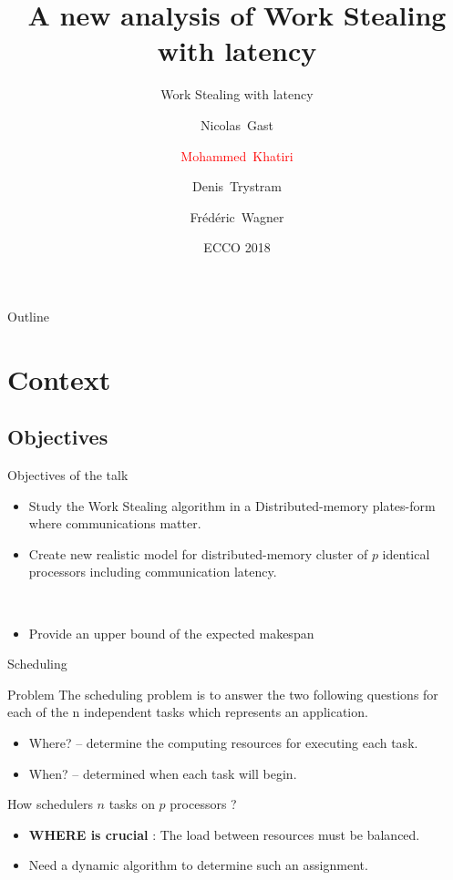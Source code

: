 \documentclass{beamer}
\title{A new analysis of Work Stealing with latency}
\subtitle{Work Stealing with latency}
\author{Nicolas~Gast\inst{1} \and \textcolor{red}{Mohammed~Khatiri}\inst{1}\inst{2} \and Denis~Trystram\inst{1} \and Frédéric~Wagner\inst{1}}
\institute[Univ. Grenoble Alpes, CNRS, Inria, LIG] %
{
    \inst{1}%
  Univ. Grenoble Alpes\\
  CNRS, Inria, LIG, France
  \and
  \inst{2}%
  University Mohammed First\\
  Faculty of Sciences, LaRI, Morocco}
\date{ECCO 2018}
\begin{document}
\begin{frame}
    \titlepage
\end{frame}

\begin{frame}{Outline}
    \tableofcontents
\end{frame}

\section{Context}

\subsection{Objectives}

\begin{frame}{Objectives of the talk}
    \begin{itemize}[<+->]
        \item {
               Study the Work Stealing algorithm in a Distributed-memory plates-form where communications matter. 
            }\\ 
        \item {

               Create new realistic model for distributed-memory cluster of $p$ identical processors including communication latency. 
            }\\          

        \item {
                Provide an upper bound of the expected makespan
            }
    \end{itemize}
\end{frame}


\begin{frame}{Scheduling}
    \begin{block}{Problem}
        The scheduling problem is to answer the two following questions
        for each of the n independent tasks which represents an application.
        \begin{itemize}
            \item \alert{Where?} – determine the computing resources for executing each task.
            \item \alert{When?} – determined when each task will begin. 

        \end{itemize}
    \end{block}
    How schedulers $n$ tasks on $p$ processors ?
    \begin{itemize}
        \item \textbf{WHERE is crucial} : The load between resources must be balanced. 
        \item Need a dynamic algorithm to determine such an assignment.

    \end{itemize}
\end{frame}
\end{document}
